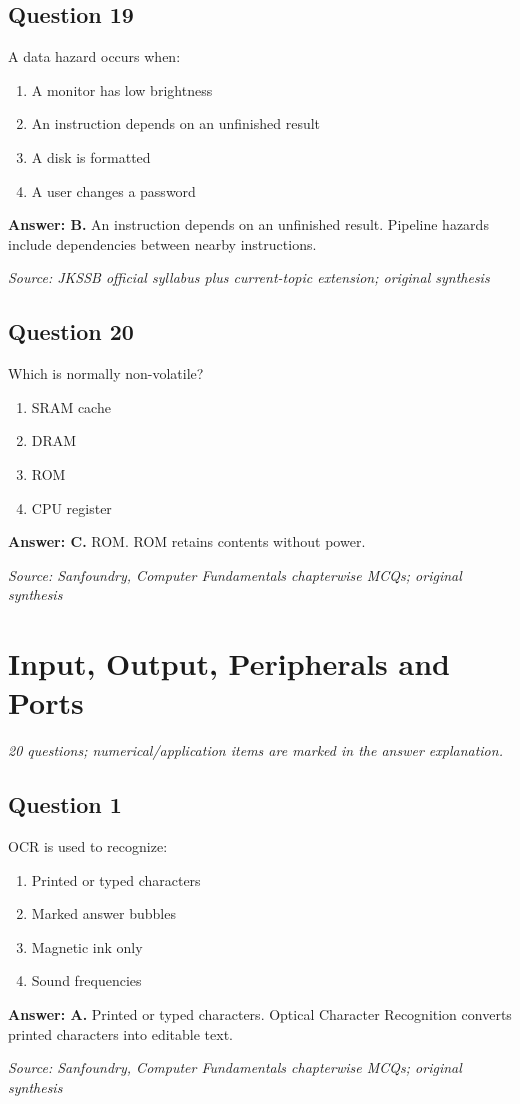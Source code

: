 \documentclass[11pt,a4paper]{book}
\newcommand{\source}[1]{\par\smallskip\textit{Source: #1}}
\newcommand{\answer}[2]{\par\textbf{Answer: #1.} #2}
\begin{document}
\section*{Question 19}
A data hazard occurs when:
\begin{enumerate}[label=\Alph*.]
\item A monitor has low brightness
\item An instruction depends on an unfinished result
\item A disk is formatted
\item A user changes a password
\end{enumerate}
\answer{B}{An instruction depends on an unfinished result. Pipeline hazards include dependencies between nearby instructions.}
\source{JKSSB official syllabus plus current-topic extension; original synthesis}
\section*{Question 20}
Which is normally non-volatile?
\begin{enumerate}[label=\Alph*.]
\item SRAM cache
\item DRAM
\item ROM
\item CPU register
\end{enumerate}
\answer{C}{ROM. ROM retains contents without power.}
\source{Sanfoundry, Computer Fundamentals chapterwise MCQs; original synthesis}

\chapter{Input, Output, Peripherals and Ports}
\textit{20 questions; numerical/application items are marked in the answer explanation.}
\section*{Question 1}
OCR is used to recognize:
\begin{enumerate}[label=\Alph*.]
\item Printed or typed characters
\item Marked answer bubbles
\item Magnetic ink only
\item Sound frequencies
\end{enumerate}
\answer{A}{Printed or typed characters. Optical Character Recognition converts printed characters into editable text.}
\source{Sanfoundry, Computer Fundamentals chapterwise MCQs; original synthesis}
\end{document}
